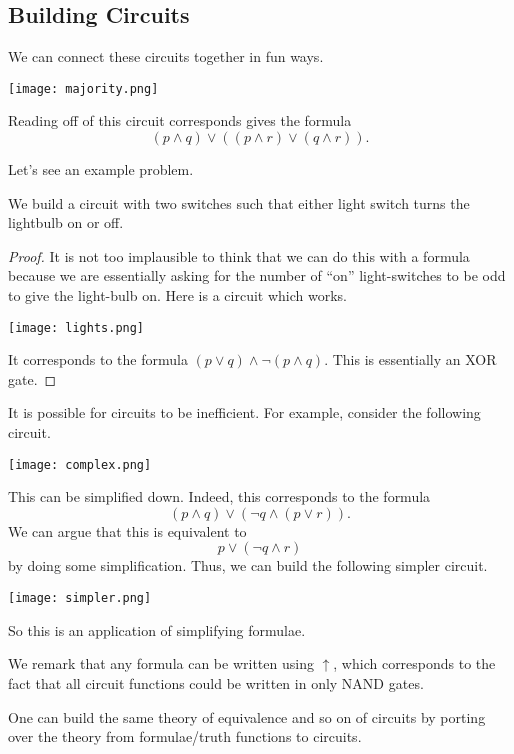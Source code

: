 \subsection{Building Circuits}
We can connect these circuits together in fun ways.
\begin{center}
	\texttt{[image: majority.png]}
\end{center}
Reading off of this circuit corresponds gives the formula
\[(p\land q)\lor((p\land r)\lor(q\land r)).\]

Let's see an example problem.
\begin{exe}
	We build a circuit with two switches such that either light switch turns the lightbulb on or off.
\end{exe}
\begin{proof}
	It is not too implausible to think that we can do this with a formula because we are essentially asking for the number of ``on'' light-switches to be odd to give the light-bulb on. Here is a circuit which works.
	\begin{center}
		\texttt{[image: lights.png]}
	\end{center}
	It corresponds to the formula $(p\lor q)\land\lnot(p\land q)$. This is essentially an XOR gate.
\end{proof}
It is possible for circuits to be inefficient. For example, consider the following circuit.
\begin{center}
	\texttt{[image: complex.png]}
\end{center}
This can be simplified down. Indeed, this corresponds to the formula
\[(p\land q)\lor(\lnot q\land(p\lor r)).\]
We can argue that this is equivalent to
\[p\lor(\lnot q\land r)\]
by doing some simplification. Thus, we can build the following simpler circuit.
\begin{center}
	\texttt{[image: simpler.png]}
\end{center}
So this is an application of simplifying formulae.
\begin{remark}
	We remark that any formula can be written using $\uparrow$, which corresponds to the fact that all circuit functions could be written in only NAND gates.
\end{remark}
\begin{remark}
	One can build the same theory of equivalence and so on of circuits by porting over the theory from formulae/truth functions to circuits.
\end{remark}